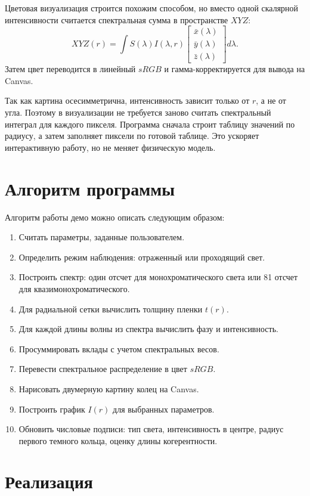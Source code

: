\documentclass[12pt,a4paper]{article}
\begin{document}
Цветовая визуализация строится похожим способом, но вместо одной скалярной интенсивности считается
спектральная сумма в пространстве \(XYZ\):
\[
XYZ(r)=\int S(\lambda)I(\lambda,r)
\begin{bmatrix}
\bar{x}(\lambda)\\
\bar{y}(\lambda)\\
\bar{z}(\lambda)
\end{bmatrix}
d\lambda.
\]
Затем цвет переводится в линейный \(sRGB\) и гамма-корректируется для вывода на Canvas.

Так как картина осесимметрична, интенсивность зависит только от \(r\), а не от угла. Поэтому в
визуализации не требуется заново считать спектральный интеграл для каждого пикселя. Программа
сначала строит таблицу значений по радиусу, а затем заполняет пиксели по готовой таблице. Это
ускоряет интерактивную работу, но не меняет физическую модель.

\section{Алгоритм программы}

Алгоритм работы демо можно описать следующим образом:
\begin{enumerate}
  \item Считать параметры, заданные пользователем.
  \item Определить режим наблюдения: отраженный или проходящий свет.
  \item Построить спектр: один отсчет для монохроматического света или 81 отсчет для
  квазимонохроматического.
  \item Для радиальной сетки вычислить толщину пленки \(t(r)\).
  \item Для каждой длины волны из спектра вычислить фазу и интенсивность.
  \item Просуммировать вклады с учетом спектральных весов.
  \item Перевести спектральное распределение в цвет \(sRGB\).
  \item Нарисовать двумерную картину колец на Canvas.
  \item Построить график \(I(r)\) для выбранных параметров.
  \item Обновить числовые подписи: тип света, интенсивность в центре, радиус первого темного кольца,
  оценку длины когерентности.
\end{enumerate}

\section{Реализация}
\end{document}
